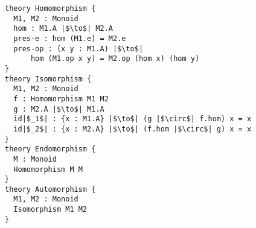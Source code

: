 \begin{verbatim}
theory Homomorphism { 
  M1, M2 : Monoid  
  hom : M1.A |$\to$| M2.A 
  pres-e : hom (M1.e) = M2.e
  pres-op : (x y : M1.A) |$\to$| 
      hom (M1.op x y) = M2.op (hom x) (hom y) 
}            
theory Isomorphism { 
  M1, M2 : Monoid  
  f : Homomorphism M1 M2 
  g : M2.A |$\to$| M1.A
  id|$_1$| : {x : M1.A} |$\to$| (g |$\circ$| f.hom) x = x    
  id|$_2$| : {x : M2.A} |$\to$| (f.hom |$\circ$| g) x = x 
}        
theory Endomorphism {
  M : Monoid 
  Homomorphism M M 
}
theory Automorphism { 
  M1, M2 : Monoid  
  Isomorphism M1 M2
}  
\end{verbatim}
